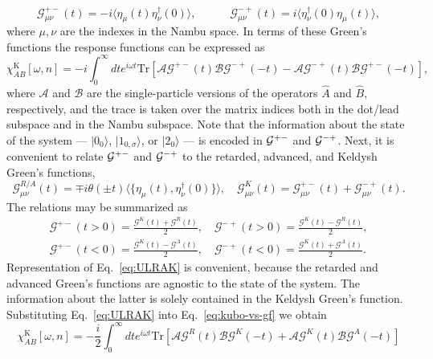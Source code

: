 \documentclass[aps,reprint,longbibliography, prb]{revtex4-2}
\begin{document}
\begin{equation}
\label{eq:pmmp}
\mathcal{G}_{\mu\nu}^{+-}(t)=-i\langle\eta_{\mu}(t)\eta_{\nu}^{\dagger}(0)\rangle,\quad\quad\quad \mathcal{G}_{\mu\nu}^{-+}(t)=i\langle\eta_{\nu}^{\dagger}(0)\eta_{\mu}(t)\rangle,
\end{equation}
where $\mu, \nu$ are the indexes in the Nambu space. In terms of these Green's functions the response functions can be expressed as
\begin{equation}
    \label{eq:kubo-vs-gf}
    \chi^\mathrm{K}_{AB}[\omega, n] = -i\int_{0}^{\infty}dte^{i\omega t}\mathrm{Tr}\left[\mathcal{A}\mathcal{G}^{+-}(t)\mathcal{B}\mathcal{G}^{-+}(-t)-\mathcal{A}\mathcal{G}^{-+}(t)\mathcal{B}\mathcal{G}^{+-}(-t)\right],
\end{equation}
where $\mathcal{A}$ and $\mathcal{B}$ are the single-particle versions of the operators $\hat{A}$ and $\hat{B}$, respectively, and the trace is taken over the matrix indices both in the dot/lead subspace and in the Nambu subspace. Note that the information about the state of the system --- $|0_0\rangle$, $|1_{0,\sigma}\rangle$, or $|2_0\rangle$ --- is encoded in ${\cal G}^{+-}$ and ${\cal G}^{-+}$. Next, it is convenient to relate ${\cal G}^{+-}$ and ${\cal G}^{-+}$ to the retarded, advanced, and Keldysh Green's functions,
\begin{equation}
\label{eq:RAK}
\mathcal{G}_{\mu\nu}^{R/A}(t)=\mp i\theta(\pm t)\langle\{\eta_{\mu}(t),\eta_{\nu}^{\dagger}(0)\}\rangle,\quad \mathcal{G}_{\mu\nu}^{K}(t)=\mathcal{G}_{\mu\nu}^{+-}(t)+\mathcal{G}_{\mu\nu}^{-+}(t).
\end{equation}
The relations may be summarized as
\begin{equation}
\label{eq:ULRAK}
\begin{gathered}
\mathcal{G}^{+-}(t>0)=\frac{\mathcal{G}^{K}(t)+\mathcal{G}^{R}(t)}{2},\quad \mathcal{G}^{-+}(t>0)=\frac{\mathcal{G}^{K}(t)-\mathcal{G}^{R}(t)}{2},\\
\mathcal{G}^{+-}(t<0)=\frac{\mathcal{G}^{K}(t)-\mathcal{G}^{A}(t)}{2},\quad \mathcal{G}^{-+}(t<0)=\frac{\mathcal{G}^{K}(t)+\mathcal{G}^{A}(t)}{2}.
\end{gathered}
\end{equation}
Representation of Eq.~\eqref{eq:ULRAK} is convenient, because the retarded and advanced Green's functions are agnostic to the state of the system. The information about the latter is solely contained in the Keldysh Green's function.  Substituting Eq.~\eqref{eq:ULRAK} into Eq.~\eqref{eq:kubo-vs-gf} we obtain
\begin{equation}
\label{eq:kubo-vs-keldysh}
\chi_{AB}^\mathrm{K}[\omega, n] = -\frac{i}{2}\int_{0}^{\infty}dt e^{i\omega t}\mathrm{Tr}\left[\mathcal{A}\mathcal{G}^{R}(t)\mathcal{B}\mathcal{G}^{K}(-t)+\mathcal{A}\mathcal{G}^{K}(t)\mathcal{B}\mathcal{G}^{A}(-t)\right]
\end{equation}
\end{document}
